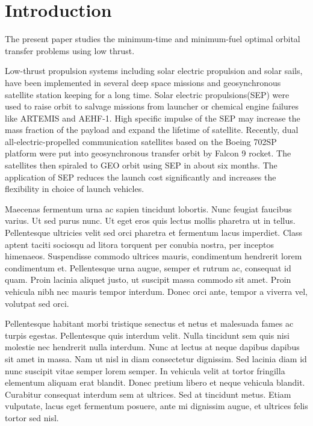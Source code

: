 \documentclass[preprint,12pt]{elsarticle}
\begin{document}
\linenumbers

\section{Introduction}
\label{S:1}
The present paper studies the minimum-time and minimum-fuel optimal orbital transfer problems using low thrust.
\par Low-thrust propulsion systems including solar electric propulsion and solar sails, have been implemented in several deep space missions\cite{rayman1999mission,kugelberg2004accommodating,tsuda2011flight} and geosynchronous satellite station keeping for a long time\cite{oleson1997advanced}. Solar electric propulsions(SEP) were used to raise orbit to salvage missions from launcher or chemical engine failures like ARTEMIS\cite{killinger2003artemis} and AEHF-1. High specific impulse of the SEP may increase the mass fraction of the payload and expand the lifetime of satellite. Recently, dual all-electric-propelled communication satellites based on the Boeing 702SP platform were put into geosynchronous transfer orbit by Falcon 9 rocket. The satellites then spiraled to GEO orbit using SEP in about six months. The application of SEP reduces the launch cost significantly and increases the flexibility in choice of launch vehicles.


Maecenas \cite{Smith:2012qr} fermentum \cite{Smith:2013jd} urna ac sapien tincidunt lobortis. Nunc feugiat faucibus varius. Ut sed purus nunc. Ut eget eros quis lectus mollis pharetra ut in tellus. Pellentesque ultricies velit sed orci pharetra et fermentum lacus imperdiet. Class aptent taciti sociosqu ad litora torquent per conubia nostra, per inceptos himenaeos. Suspendisse commodo ultrices mauris, condimentum hendrerit lorem condimentum et. Pellentesque urna augue, semper et rutrum ac, consequat id quam. Proin lacinia aliquet justo, ut suscipit massa commodo sit amet. Proin vehicula nibh nec mauris tempor interdum. Donec orci ante, tempor a viverra vel, volutpat sed orci.

Pellentesque habitant morbi tristique senectus et netus et malesuada fames ac turpis egestas. Pellentesque quis interdum velit. Nulla tincidunt sem quis nisi molestie nec hendrerit nulla interdum. Nunc at lectus at neque dapibus dapibus sit amet in massa. Nam ut nisl in diam consectetur dignissim. Sed lacinia diam id nunc suscipit vitae semper lorem semper. In vehicula velit at tortor fringilla elementum aliquam erat blandit. Donec pretium libero et neque vehicula blandit. Curabitur consequat interdum sem at ultrices. Sed at tincidunt metus. Etiam vulputate, lacus eget fermentum posuere, ante mi dignissim augue, et ultrices felis tortor sed nisl.
\end{document}
